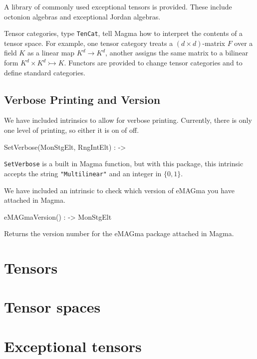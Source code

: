 \documentclass{documentation}
\begin{document}
A library of commonly used exceptional tensors is provided.
These include octonion algebras and exceptional Jordan algebras.
 
Tensor categories, type {\tt TenCat}, tell Magma how to interpret the
contents of a tensor space.  For example, one tensor category treats a 
$(d\times d)$-matrix $F$ over a field $K$ as a linear map $K^d\to K^d$,
another assigns the same matrix to a bilinear form 
$K^d\times K^d\rightarrowtail K$.  Functors are provided to change
tensor categories and to define standard categories.  

\section{Verbose Printing and Version}

We have included intrinsics to allow for verbose printing. 
Currently, there is only one level of printing, so either it is on of off. 

\begin{intrinsics}
SetVerbose(MonStgElt, RngIntElt) : -> 
\end{intrinsics}

{\tt SetVerbose} is a built in Magma function, but with this package, this intrinsic accepts the string {\tt "Multilinear"} and an integer in $\{0,1\}$. 

We have included an intrinsic to check which version of eMAGma you have attached in Magma.

\begin{intrinsics}
eMAGmaVersion() : -> MonStgElt
\end{intrinsics}

Returns the version number for the eMAGma package attached in Magma.

\chapter{Tensors}




\chapter{Tensor spaces}



\chapter{Exceptional tensors}
\end{document}
